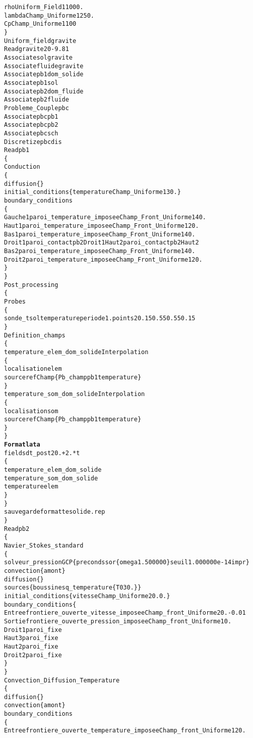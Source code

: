 \begin{alltt}
    rho Uniform_Field 1 1000.
    lambda Champ_Uniforme 1 250.
    Cp Champ_Uniforme 1 100
\}
Uniform_field gravite
Read gravite 2 0 -9.81
Associate sol gravite
Associate fluide gravite
Associate pb1 dom_solide
Associate pb1 sol
Associate pb2 dom_fluide
Associate pb2 fluide
Probleme_Couple pbc
Associate pbc pb1
Associate pbc pb2
Associate pbc sch
Discretize pbc dis
Read pb1
\{
    Conduction
    \{
        diffusion \{ \}
        initial_conditions \{ temperature Champ_Uniforme 1 30. \}
        boundary_conditions
        \{
            Gauche1 paroi_temperature_imposee   Champ_Front_Uniforme 1 40.
            Haut1   paroi_temperature_imposee   Champ_Front_Uniforme 1 20.
            Bas1    paroi_temperature_imposee   Champ_Front_Uniforme 1 40.
            Droit1  paroi_contact pb2  Droit1   Haut2   paroi_contact pb2  Haut2
            Bas2    paroi_temperature_imposee   Champ_Front_Uniforme 1 40.
            Droit2  paroi_temperature_imposee   Champ_Front_Uniforme 1 20.
        \}
    \}
    Post_processing
    \{
        Probes
        \{
            sonde_tsol temperature periode 1. points 2     0.15 0.55     0.55 0.15 
        \}
        Definition_champs 
        \{
            temperature_elem_dom_solide Interpolation
            \{
                localisation elem
                source refChamp \{ Pb_champ pb1 temperature \}
            \}
            temperature_som_dom_solide Interpolation 
            \{
                localisation som
                source refChamp \{ Pb_champ pb1 temperature \}
            \}
        \}
        {\bf{Format lata}}
        fields dt_post 20.+2.*t
        \{
            temperature_elem_dom_solide
            temperature_som_dom_solide
            temperature elem
        \}
    \}
    sauvegarde formatte solide.rep
\}
Read pb2
\{
    Navier_Stokes_standard
    \{
        solveur_pression GCP \{ precond ssor \{ omega 1.500000 \} seuil 1.000000e-14 impr \}
        convection \{ amont \}
        diffusion \{ \}
        sources \{ boussinesq_temperature \{ T0 30. \} \}
        initial_conditions \{ vitesse Champ_Uniforme 2 0. 0. \}
        boundary_conditions \{
            Entree frontiere_ouverte_vitesse_imposee    Champ_front_Uniforme 2 0. -0.01
            Sortie frontiere_ouverte_pression_imposee   Champ_front_Uniforme 1 0.
            Droit1 paroi_fixe
            Haut3  paroi_fixe
            Haut2  paroi_fixe
            Droit2 paroi_fixe
        \}
    \}
    Convection_Diffusion_Temperature
    \{
        diffusion \{ \}
        convection \{ amont \}
        boundary_conditions 
        \{
            Entree frontiere_ouverte_temperature_imposee    Champ_front_Uniforme 1 20.

\end{alltt}
